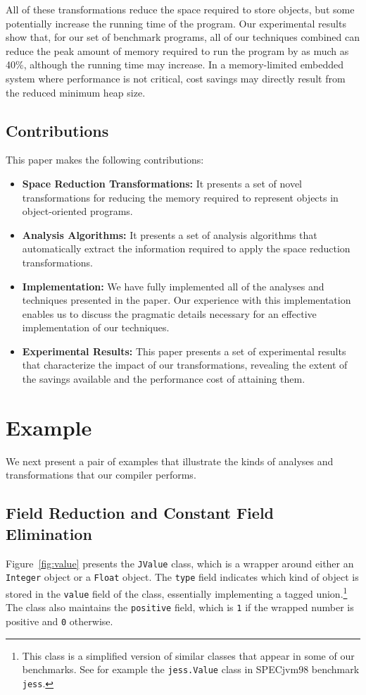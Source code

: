 \documentclass{sig-alt-full}
\begin{document}
All of these transformations reduce the space required to store
objects, but some potentially increase the running time of the program.
Our experimental results show that, for our set of benchmark
programs, all of our techniques combined can reduce the peak amount of memory
required to run the program by as much as 40\%, although the running
time may increase.  In a memory-limited embedded system where
performance is not critical, cost savings may directly result from the
reduced minimum heap size.

\subsection{Contributions}

This paper makes the following contributions:
\begin{itemize}
\item {\bf Space Reduction Transformations:} It presents a set
of novel transformations for reducing the memory required to 
represent objects in object-oriented programs.

\item {\bf Analysis Algorithms:} It presents a set of 
analysis algorithms that automatically extract the 
information required to apply the space reduction 
transformations.

\item {\bf Implementation:} We have fully 
implemented all of the analyses and techniques 
presented in the paper. Our experience with this
implementation enables us to discuss the pragmatic
details necessary for an effective implementation 
of our techniques. 

\item {\bf Experimental Results:} This paper presents a set
of experimental results that characterize the impact
of our transformations, revealing the extent of the
savings available and the performance cost of attaining them.
\end{itemize}
%
\section{Example}
%
We next present a pair of examples that illustrate the kinds of 
analyses and transformations that our compiler performs.
%
\subsection{Field Reduction and Constant Field \\ Elimination}
%
Figure~\ref{fig:value} presents the {\tt JValue} class, which is 
a wrapper around either an {\tt Integer} object or a {\tt Float}
object. The {\tt type} field indicates which kind of object
is stored in the {\tt value} field of the class, 
essentially implementing a tagged 
union.\footnote{This class is a simplified version of similar
classes that appear in some of our benchmarks.
See for example the {\tt jess.Value} class in SPECjvm98 benchmark
{\tt jess}.} 
The class also maintains the {\tt positive} field, which is
{\tt 1} if the wrapped number is positive and {\tt 0} otherwise. 
\end{document}
